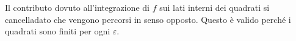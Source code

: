\documentclass[preview]{standalone}
\begin{document}
\begin{center}
Il contributo dovuto all'integrazione di $f$ sui lati interni dei quadrati si cancelladato che vengono percorsi in senso opposto. Questo è valido perché i quadrati sono finiti per ogni $\varepsilon$.
\end{center}
\end{document}
